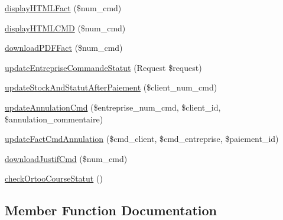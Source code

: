 \begin{DoxyCompactItemize}
\mbox{\hyperlink{class_app_1_1_http_1_1_controllers_1_1_facture_controller_a452f5de1c69b8b7efd59a91790a8303e}{display\+H\+T\+M\+L\+Fact}} (\$num\+\_\+cmd)
\item 
\mbox{\hyperlink{class_app_1_1_http_1_1_controllers_1_1_facture_controller_abef192f1366f00c8660afccecef28489}{display\+H\+T\+M\+L\+C\+MD}} (\$num\+\_\+cmd)
\item 
\mbox{\hyperlink{class_app_1_1_http_1_1_controllers_1_1_facture_controller_a59f078b7f23013235aad674a250796f1}{download\+P\+D\+F\+Fact}} (\$num\+\_\+cmd)
\item 
\mbox{\hyperlink{class_app_1_1_http_1_1_controllers_1_1_facture_controller_aa8895a292bd34440de21b91ec5e5522d}{update\+Entreprise\+Commande\+Statut}} (Request \$request)
\item 
\mbox{\hyperlink{class_app_1_1_http_1_1_controllers_1_1_facture_controller_a7fa9af1e7f6f2878bef120c82ed27e6a}{update\+Stock\+And\+Statut\+After\+Paiement}} (\$client\+\_\+num\+\_\+cmd)
\item 
\mbox{\hyperlink{class_app_1_1_http_1_1_controllers_1_1_facture_controller_a5b611149a0aefc2c430a913452620c2f}{update\+Annulation\+Cmd}} (\$entreprise\+\_\+num\+\_\+cmd, \$client\+\_\+id, \$annulation\+\_\+commentaire)
\item 
\mbox{\hyperlink{class_app_1_1_http_1_1_controllers_1_1_facture_controller_ad5a9ea303dd3ded165ce4ec9afe22dde}{update\+Fact\+Cmd\+Annulation}} (\$cmd\+\_\+client, \$cmd\+\_\+entreprise, \$paiement\+\_\+id)
\item 
\mbox{\hyperlink{class_app_1_1_http_1_1_controllers_1_1_facture_controller_a0c925ad1bc8923cb331df09239943028}{download\+Justif\+Cmd}} (\$num\+\_\+cmd)
\item 
\mbox{\hyperlink{class_app_1_1_http_1_1_controllers_1_1_facture_controller_aaffc749bfd13247172edbdd7acc45ba7}{check\+Ortoo\+Course\+Statut}} ()
\end{DoxyCompactItemize}


\subsection{Member Function Documentation}
\mbox{\label{class_app_1_1_http_1_1_controllers_1_1_facture_controller_a31a98707fdd24667fdc5f63de65a1b97}} 
